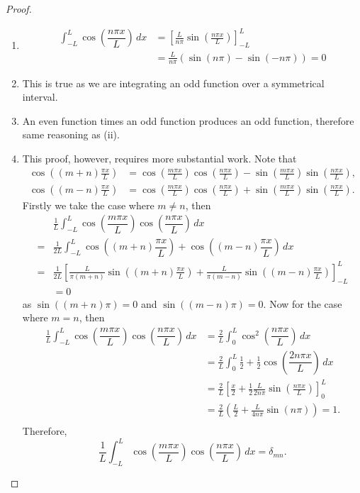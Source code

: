 \begin{proof}
    \begin{enumerate}
        \item 
        \begin{align*}
            \int_{-L}^L\cos{\left(\dfrac{n\pi x}{L}\right)}\,dx&=\left[\frac L{n\pi}\sin{\left(\frac{n\pi x}L\right)}\right]^L_{-L}\\
            &=\frac L{n\pi}\left(\sin{(n\pi)-\sin{(-n\pi)}}\right)=0
        \end{align*}
        
        \item This is true as we are integrating an odd function over a symmetrical interval.
        
        \item An even function times an odd function produces an odd function, therefore same reasoning as (ii).
        
        \item This proof, however, requires more substantial work. Note that
        \begin{align*}
            \cos{\left((m+n)\frac{\pi x}L\right)}&=\cos{\left(\frac{m\pi x}L\right)}\cos{\left(\frac{n\pi x}L\right)}-\sin{\left(\frac{m\pi x}L\right)}\sin{\left(\frac{n\pi x}L\right)},\\
            \cos{\left((m-n)\frac{\pi x}L\right)}&=\cos{\left(\frac{m\pi x}L\right)}\cos{\left(\frac{n\pi x}L\right)}+\sin{\left(\frac{m\pi x}L\right)}\sin{\left(\frac{n\pi x}L\right)}.
        \end{align*}
        Firstly we take the case where $m\neq n$, then
        \begin{align*}
            &\frac1L\int_{-L}^L\cos{\left(\dfrac{m\pi x}{L}\right)}\cos{\left(\dfrac{n\pi x}{L}\right)}\,dx\\
            =&\frac1{2L}\int_{-L}^L\cos{\left((m+n)\dfrac{\pi x}{L}\right)}+\cos{\left((m-n)\dfrac{\pi x}{L}\right)}\,dx\\
            =&\frac1{2L}\left[\frac L{\pi(m+n)}\sin{\left((m+n)\frac{\pi x}L\right)}+\frac L{\pi(m-n)}\sin{\left((m-n)\frac{\pi x}L\right)}\right]^L_{-L}\\
            &=0
        \end{align*}
        as $\sin{((m+n)\pi)}=0$ and $\sin{((m-n)\pi)}=0$. Now for the case where $m=n$, then 
        \begin{align*}
            \frac1L\int_{-L}^L\cos{\left(\dfrac{m\pi x}{L}\right)}\cos{\left(\dfrac{n\pi x}{L}\right)}\,dx&=\frac2L\int_0^L\cos^2{\left(\dfrac{n\pi x}{L}\right)}\,dx\\
            &=\frac2L\int_0^L\frac12+\frac12\cos{\left(\dfrac{2n\pi x}{L}\right)}\,dx\\
            &=\frac2L\left[\frac x2+\frac12\frac L{2n\pi}\sin{\left(\frac{n\pi x}L\right)}\right]^L_0\\
            &=\frac2L\left(\frac L2+\frac L{4n\pi}\sin{\left(n\pi\right)}\right)=1.\\
        \end{align*}
        Therefore, \[\frac1L\int_{-L}^L\cos{\left(\dfrac{m\pi x}{L}\right)}\cos{\left(\dfrac{n\pi x}{L}\right)}\,dx=\delta_{mn}.\]
        

\end{enumerate}
\end{proof}
